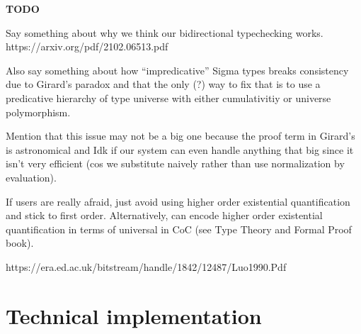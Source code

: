 \documentclass{article}
\begin{document}
\textbf{TODO}

Say something about why we think our bidirectional typechecking works.
https://arxiv.org/pdf/2102.06513.pdf

Also say something about how ``impredicative'' Sigma types breaks consistency
due to Girard's paradox and that the only (?) way to fix that is to use a 
predicative hierarchy of type universe with either cumulativitiy or universe
polymorphism.

Mention that this issue may not be a big one because the proof term in Girard's
is astronomical and Idk if our system can even handle anything that big since it
isn't very efficient (cos we substitute naively rather than use normalization
by evaluation).

If users are really afraid, just avoid using higher order existential
quantification and stick to first order. Alternatively, can encode higher order
existential quantification in terms of universal in CoC (see Type Theory and
Formal Proof book).

https://era.ed.ac.uk/bitstream/handle/1842/12487/Luo1990.Pdf

\section{Technical implementation}
\end{document}
